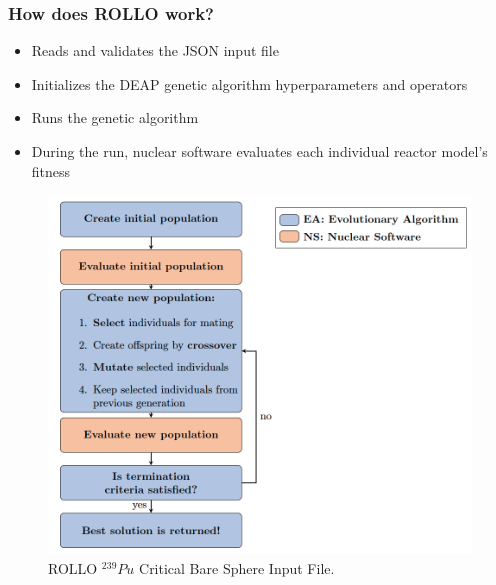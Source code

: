 \begin{frame}
    \frametitle{How does ROLLO work?}
    \begin{minipage}[c]{0.45\textwidth}
        \begin{itemize}
            \item Reads and validates the JSON input file
            \item Initializes the \acrfull{DEAP} genetic algorithm hyperparameters and 
            operators 
            \item Runs the genetic algorithm  
            \item During the run, nuclear software evaluates each individual reactor 
            model's fitness
        \end{itemize}
    \end{minipage}\hfill
    \begin{minipage}[c]{0.52\textwidth}
        \centering
        \begin{figure}
            \includegraphics[width=\linewidth]{figures/rollo-flow.png} 
            \caption{ROLLO $^{239}Pu$ Critical Bare Sphere Input File.}
        \end{figure}
    \end{minipage}
\end{frame}

